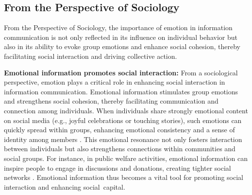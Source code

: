 \subsection{From the Perspective of Sociology}%

From the Perspective of Sociology, the importance of emotion in information communication is not only reflected in its influence on individual behavior but also in its ability to evoke group emotions and enhance social cohesion, thereby facilitating social interaction and driving collective action.

\textbf{Emotional information promotes social interaction:} From a sociological perspective, emotion plays a critical role in enhancing social interaction in information communication. Emotional information stimulates group emotions and strengthens social cohesion, thereby facilitating communication and connection among individuals. When individuals share strongly emotional content on social media (e.g., joyful celebrations or touching stories), such emotions can quickly spread within groups, enhancing emotional consistency and a sense of identity among members \cite{stieglitz2013emotions, ferrara2015measuring}. This emotional resonance not only fosters interaction between individuals but also strengthens connections within communities and social groups. For instance, in public welfare activities, emotional information can inspire people to engage in discussions and donations, creating tighter social networks \cite{son2022emotion}. Emotional information thus becomes a vital tool for promoting social interaction and enhancing social~capital.

